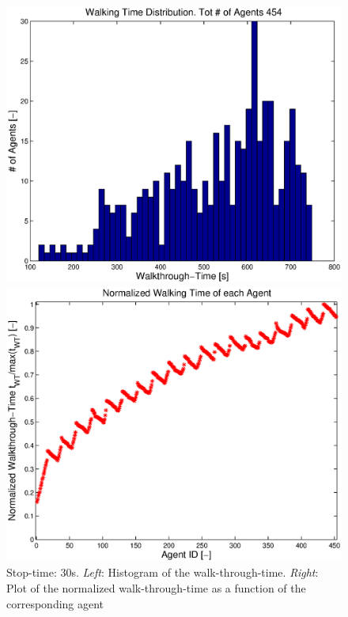 \documentclass[11pt]{article}
\begin{document}
\begin{figure}
 	\begin{minipage}{0.48\textwidth}
		\includegraphics[width = \textwidth]{Images/RESULTS02_Stop30/WalkingTimeHist.eps}
 	 \end{minipage}
  	\hfill
  	\begin{minipage}{0.48\textwidth}
   		 \includegraphics[width = \textwidth]{Images/RESULTS02_Stop30/NormalizedWalkingTimePlot.eps}
  	\end{minipage}
  	\caption{Stop-time: 30s. \emph{Left}: Histogram of the walk-through-time. \emph{Right}: Plot of the normalized walk-through-time as a function of the corresponding agent}
	\label{img:stopTime30WTT}
\end{figure}
\end{document}
